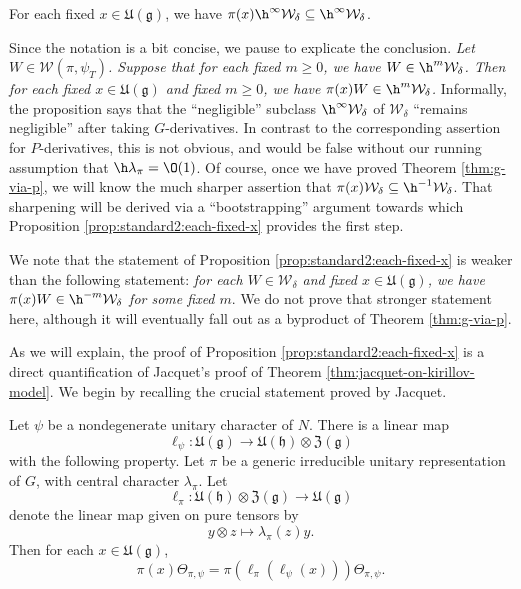 \begin{proposition}\label{prop:standard2:each-fixed-x}
  For each fixed $x \in \mathfrak{U}(\mathfrak{g})$, we have $\pi(x) \h^\infty \mathcal{W}_\delta \subseteq \h^\infty \mathcal{W}_\delta$.
\end{proposition}
\begin{remark}
  Since the notation is a bit concise, we pause to explicate the conclusion.  \emph{Let $W \in \mathcal{W}(\pi,\psi_T)$.  Suppose that for each fixed $m \geq 0$, we have $W \in \h^m \mathcal{W}_\delta$.  Then for each fixed $x \in \mathfrak{U}(\mathfrak{g})$ and fixed $m \geq 0$, we have $\pi(x) W \in \h^m \mathcal{W}_\delta$.}  Informally, the proposition says that the ``negligible'' subclass $\h^\infty \mathcal{W}_\delta$ of $\mathcal{W}_\delta$ ``remains negligible'' after taking $G$-derivatives.  In contrast to the corresponding assertion for $P$-derivatives, this is not obvious, and would be false without our running assumption that $\h \lambda_\pi = \O(1)$.  Of course, once we have proved Theorem \ref{thm:g-via-p}, we will know the much sharper assertion that $\pi(x) \mathcal{W}_\delta \subseteq \h^{-1} \mathcal{W}_\delta$.  That sharpening will be derived via a ``bootstrapping'' argument towards which Proposition \ref{prop:standard2:each-fixed-x} provides the first step.

  We note that the statement of Proposition \ref{prop:standard2:each-fixed-x} is weaker than the following statement: \emph{for each $W \in \mathcal{W}_\delta$ and fixed $x \in \mathfrak{U}(\mathfrak{g})$, we have $\pi(x) W \in \h^{-m} \mathcal{W}_\delta$ for some fixed $m$}.  We do not prove that stronger statement here, although it will eventually fall out as a byproduct of Theorem \ref{thm:g-via-p}.
\end{remark}
As we will explain, the proof of Proposition \ref{prop:standard2:each-fixed-x} is a direct quantification of Jacquet's proof of Theorem \ref{thm:jacquet-on-kirillov-model}.  We begin by recalling the crucial statement proved by Jacquet.
\begin{lemma}\label{lemma:cuhn9kcb25}
  Let $\psi$ be a nondegenerate unitary character of $N$.  There is a linear map
  \begin{equation*}
    \ell_{\psi} : \mathfrak{U}(\mathfrak{g}) \rightarrow \mathfrak{U}(\mathfrak{h}) \otimes \mathfrak{Z}(\mathfrak{g})
  \end{equation*}
  with the following property.  Let $\pi$ be a generic irreducible unitary representation of $G$, with central character $\lambda_\pi$.  Let
  \begin{equation*}
    \ell_\pi : \mathfrak{U}(\mathfrak{h}) \otimes \mathfrak{Z}(\mathfrak{g}) \rightarrow \mathfrak{U}(\mathfrak{g})
  \end{equation*}
  denote the linear map given on pure tensors by
  \begin{equation*}
    y \otimes z \mapsto \lambda_\pi(z) y.
  \end{equation*}
  Then for each $x \in \mathfrak{U}(\mathfrak{g})$,
  \begin{equation}\label{eq:pix-theta_pi-psi}
    \pi(x) \Theta_{\pi,\psi} = \pi(\ell_{\pi}(\ell_\psi(x))) \Theta_{\pi,\psi}.
  \end{equation}
\end{lemma}
